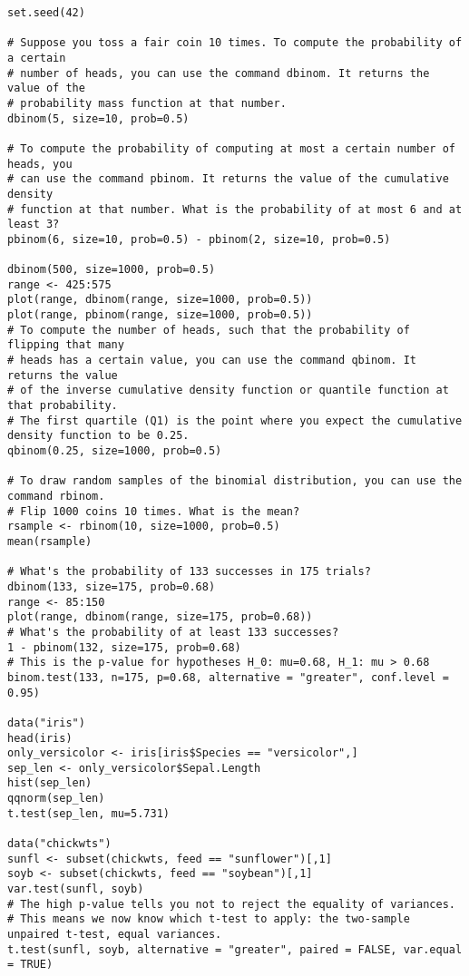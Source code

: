 \begin{verbatim}
set.seed(42)

# Suppose you toss a fair coin 10 times. To compute the probability of a certain
# number of heads, you can use the command dbinom. It returns the value of the
# probability mass function at that number.
dbinom(5, size=10, prob=0.5)

# To compute the probability of computing at most a certain number of heads, you
# can use the command pbinom. It returns the value of the cumulative density
# function at that number. What is the probability of at most 6 and at least 3?
pbinom(6, size=10, prob=0.5) - pbinom(2, size=10, prob=0.5)

dbinom(500, size=1000, prob=0.5)
range <- 425:575
plot(range, dbinom(range, size=1000, prob=0.5))
plot(range, pbinom(range, size=1000, prob=0.5))
# To compute the number of heads, such that the probability of flipping that many
# heads has a certain value, you can use the command qbinom. It returns the value
# of the inverse cumulative density function or quantile function at that probability.
# The first quartile (Q1) is the point where you expect the cumulative density function to be 0.25.
qbinom(0.25, size=1000, prob=0.5)

# To draw random samples of the binomial distribution, you can use the command rbinom.
# Flip 1000 coins 10 times. What is the mean?
rsample <- rbinom(10, size=1000, prob=0.5)
mean(rsample)

# What's the probability of 133 successes in 175 trials?
dbinom(133, size=175, prob=0.68)
range <- 85:150
plot(range, dbinom(range, size=175, prob=0.68))
# What's the probability of at least 133 successes?
1 - pbinom(132, size=175, prob=0.68)
# This is the p-value for hypotheses H_0: mu=0.68, H_1: mu > 0.68
binom.test(133, n=175, p=0.68, alternative = "greater", conf.level = 0.95)

data("iris")
head(iris)
only_versicolor <- iris[iris$Species == "versicolor",]
sep_len <- only_versicolor$Sepal.Length
hist(sep_len)
qqnorm(sep_len)
t.test(sep_len, mu=5.731)

data("chickwts")
sunfl <- subset(chickwts, feed == "sunflower")[,1]
soyb <- subset(chickwts, feed == "soybean")[,1]
var.test(sunfl, soyb)
# The high p-value tells you not to reject the equality of variances.
# This means we now know which t-test to apply: the two-sample unpaired t-test, equal variances.
t.test(sunfl, soyb, alternative = "greater", paired = FALSE, var.equal = TRUE)

\end{verbatim}
